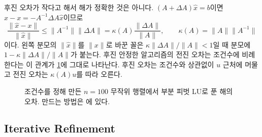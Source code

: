 후진 오차가 작다고 해서 해가 정확한 것은 아니다. $(A+\Delta A)\hat x=b$이면 $\hat x-x=-A^{-1}\Delta A\hat x$이므로
\[
\frac{\|\hat x-x\|}{\|\hat x\|}\le\|A^{-1}\|\|\Delta A\|=\kappa(A)\frac{\|\Delta A\|}{\|A\|},\qquad\kappa(A)=\|A\|\|A^{-1}\|
\]
이다. 왼쪽 분모의 $\|\hat x\|$를 $\|x\|$로 바꾼 꼴은 $\kappa\|\Delta A\|/\|A\|<1$일 때 분모에 $1-\kappa\|\Delta A\|/\|A\|$가 붙는다. 후진 안정한 알고리즘의 전진 오차는 조건수에 비례한다는 이 관계가 \cref{fig:lu-forward}에 그대로 나타난다. 후진 오차는 조건수와 상관없이 $u$ 근처에 머물고 전진 오차는 $\kappa(A)u$를 따라 오른다.

\begin{figure}[htbp]
\centering
{}
\caption{조건수를 정해 만든 $n=100$ 무작위 행렬에서 부분 피벗 LU로 푼 해의 오차. 만드는 방법은 에 있다.}
\label{fig:lu-forward}
\end{figure}

\subsection{Iterative Refinement}


